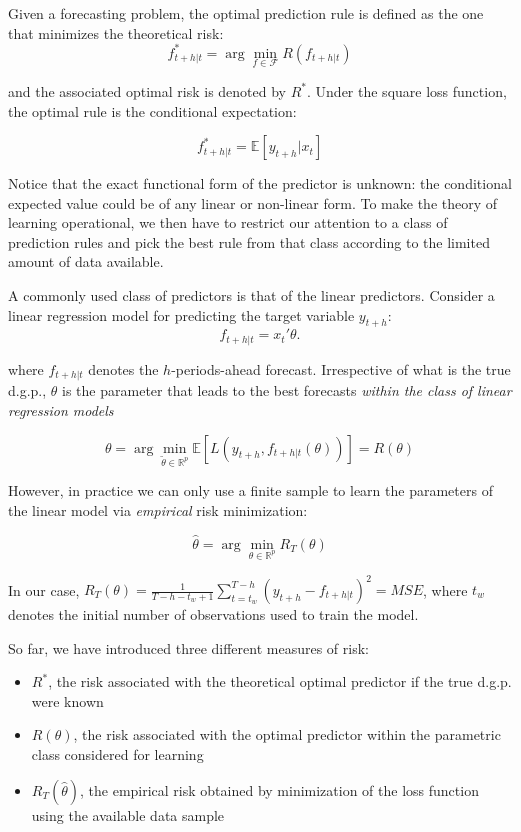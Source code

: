 \documentclass[
]{book}
\providecommand{\tightlist}{%
  \setlength{\itemsep}{0pt}\setlength{\parskip}{0pt}}
\begin{document}
Given a forecasting problem, the optimal prediction rule is defined as the one that minimizes the theoretical risk:
\[
f_{t+h|t}^* = \arg\min_{f \in \mathcal{F}} R(f_{t+h|t}) 
\]

and the associated optimal risk is denoted by \(R^*\). Under the square loss function, the optimal rule is the conditional expectation:

\[
f_{t+h|t}^* = \mathbb{E}[y_{t+h}| x_t]
\]

Notice that the exact functional form of the predictor is unknown: the conditional expected value could be of any linear or non-linear form. To make the theory of learning operational, we then have to restrict our attention to a class of prediction rules and pick the best rule from that class according to the limited amount of data available.

A commonly used class of predictors is that of the linear predictors. Consider a linear regression model for predicting the target variable \(y_{t+h}\):
\[
f_{t+h|t} = x_t'\theta.
\]

where \(f_{t+h|t}\) denotes the \(h\)-periods-ahead forecast. Irrespective of what is the true d.g.p., \(\theta\) is the parameter that leads to the best forecasts \emph{within the class of linear regression models}

\[
\theta = \arg\min_{\tilde{\theta} \in \mathbb{R}^p} \mathbb{E}[L(y_{t+h}, f_{t+h|t}(\theta))] = R(\theta)
\]

However, in practice we can only use a finite sample to learn the parameters of the linear model via \emph{empirical} risk minimization:

\[
\hat{\theta} = \arg\min_{\theta \in \mathbb{R}^p} R_T(\theta)
\]

In our case, \(R_T(\theta) = \frac{1}{T-h-t_w+1}\sum_{t=t_w}^{T-h} (y_{t+h} - f_{t+h|t})^2 = MSE\), where \(t_w\) denotes the initial number of observations used to train the model.

So far, we have introduced three different measures of risk:

\begin{itemize}
\tightlist
\item
  \(R^*\), the risk associated with the theoretical optimal predictor if the true d.g.p. were known
\item
  \(R(\theta)\), the risk associated with the optimal predictor within the parametric class considered for learning
\item
  \(R_T(\hat\theta)\), the empirical risk obtained by minimization of the loss function using the available data sample
\end{itemize}
\end{document}
